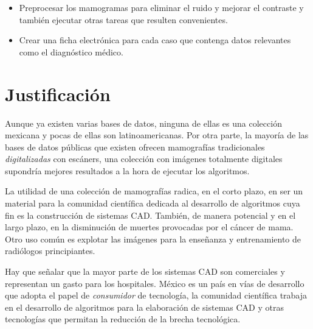 \begin{itemize}
    \item Preprocesar los mamogramas para eliminar el ruido y mejorar el
    contraste y también ejecutar otras tareas que resulten convenientes.
    \item Crear una ficha electrónica para cada caso que contenga datos
    relevantes como el diagnóstico médico.
\end{itemize}

\section{Justificación}

Aunque ya existen varias bases de datos, ninguna de ellas es una colección
mexicana y pocas de ellas son latinoamericanas. Por otra parte, la mayoría de
las bases de datos públicas que existen ofrecen mamografías tradicionales
\textit{digitalizadas} con escáners, una colección con imágenes totalmente
digitales supondría mejores resultados a la hora de ejecutar los algoritmos.

La utilidad de una colección de mamografías radica, en el corto plazo, en ser
un material para la comunidad científica dedicada al desarrollo de algoritmos
cuya fin es la construcción de sistemas CAD. También, de manera potencial y en
el largo plazo, en la disminución de muertes provocadas por el cáncer de mama.
Otro uso común es explotar las imágenes para la enseñanza y entrenamiento
de radiólogos principiantes.

Hay que señalar que la mayor parte de los sistemas CAD son comerciales y
representan un gasto para los hospitales. México es un país en vías de
desarrollo que adopta el papel de \textit{consumidor} de tecnología, la
comunidad científica trabaja en el desarrollo de algoritmos para la elaboración
de sistemas CAD y otras tecnologías que permitan la reducción de la brecha
tecnológica.
